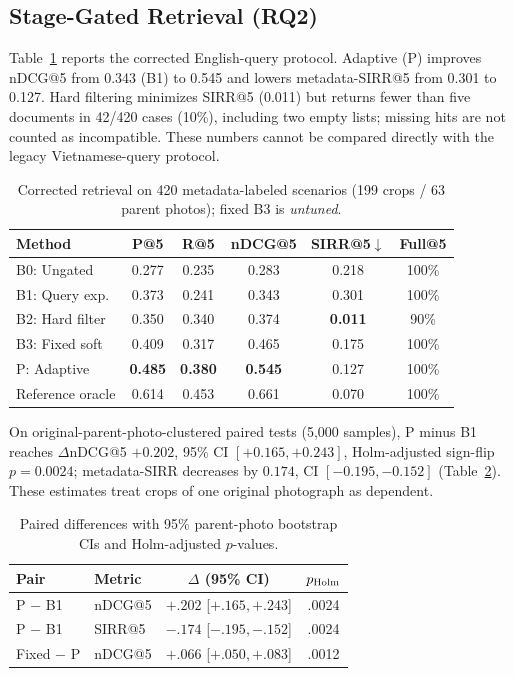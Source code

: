 \documentclass[conference,a4paper]{IEEEtran}
\begin{document}
\subsection{Stage-Gated Retrieval (RQ2)}

Table~\ref{tab:retrieval-results} reports the corrected English-query protocol. Adaptive (P) improves nDCG@5 from 0.343 (B1) to 0.545 and lowers metadata-SIRR@5 from 0.301 to 0.127. Hard filtering minimizes SIRR@5 (0.011) but returns fewer than five documents in 42/420 cases (10\%), including two empty lists; missing hits are not counted as incompatible. These numbers cannot be compared directly with the legacy Vietnamese-query protocol.

\begin{table}[t]
\centering
\caption{Corrected retrieval on 420 metadata-labeled scenarios (199 crops / 63 parent photos); fixed B3 is \emph{untuned}.}
\label{tab:retrieval-results}
\scriptsize
\setlength{\tabcolsep}{3.0pt}
\begin{tabular}{lccccc}
\toprule
\textbf{Method} & \textbf{P@5} & \textbf{R@5} & \textbf{nDCG@5} & \textbf{SIRR@5}$\downarrow$ & \textbf{Full@5} \\
\midrule
B0: Ungated & 0.277 & 0.235 & 0.283 & 0.218 & 100\% \\
B1: Query exp. & 0.373 & 0.241 & 0.343 & 0.301 & 100\% \\
B2: Hard filter & 0.350 & 0.340 & 0.374 & \textbf{0.011} & 90\% \\
B3: Fixed soft & 0.409 & 0.317 & 0.465 & 0.175 & 100\% \\
P: Adaptive & \textbf{0.485} & \textbf{0.380} & \textbf{0.545} & 0.127 & 100\% \\
Reference oracle & 0.614 & 0.453 & 0.661 & 0.070 & 100\% \\
\bottomrule
\end{tabular}
\end{table}

On original-parent-photo-clustered paired tests (5{,}000 samples), P minus B1 reaches $\Delta$nDCG@5 $+0.202$, 95\% CI $[+0.165,+0.243]$, Holm-adjusted sign-flip $p=0.0024$; metadata-SIRR decreases by $0.174$, CI $[-0.195,-0.152]$ (Table~\ref{tab:paired}). These estimates treat crops of one original photograph as dependent.

\begin{table}[t]
\centering
\caption{Paired differences with 95\% parent-photo bootstrap CIs and Holm-adjusted $p$-values.}
\label{tab:paired}
\scriptsize
\setlength{\tabcolsep}{3pt}
\begin{tabular}{llcc}
\toprule
\textbf{Pair} & \textbf{Metric} & \textbf{$\Delta$ (95\% CI)} & \textbf{$p_{\rm Holm}$}\\
\midrule
P $-$ B1 & nDCG@5 & $+.202$ [$+.165,+.243$] & .0024 \\
P $-$ B1 & SIRR@5 & $-.174$ [$-.195,-.152$] & .0024 \\
Fixed $-$ P & nDCG@5 & $+.066$ [$+.050,+.083$] & .0012 \\
\bottomrule
\end{tabular}
\end{table}
\end{document}
